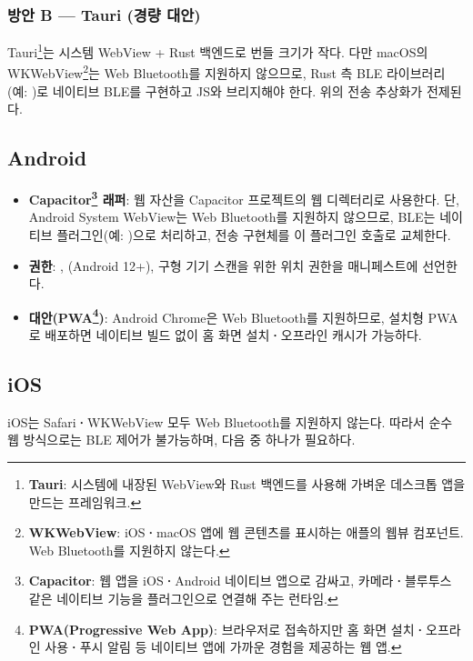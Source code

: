 \subsubsection{방안 B --- Tauri (경량 대안)}

Tauri\footnote{\textbf{Tauri}: 시스템에 내장된 WebView와 Rust 백엔드를 사용해 가벼운 데스크톱
앱을 만드는 프레임워크.}는 시스템 WebView + Rust 백엔드로 번들 크기가 작다. 다만 macOS의
WKWebView\footnote{\textbf{WKWebView}: iOS\textbf{·}macOS 앱에 웹 콘텐츠를 표시하는 애플의 웹뷰
컴포넌트. Web Bluetooth를 지원하지 않는다.}는 Web Bluetooth를 지원하지 않으므로, Rust 측 BLE 라이브러리
(예: )로 네이티브 BLE를 구현하고 JS와 브리지해야 한다.
위의 전송 추상화가 전제된다.

\subsection{Android}

\begin{itemize}
  \item \textbf{Capacitor\footnote{\textbf{Capacitor}: 웹 앱을 iOS\textbf{·}Android 네이티브 앱으로
        감싸고, 카메라\textbf{·}블루투스 같은 네이티브 기능을 플러그인으로 연결해 주는 런타임.} 래퍼}:
         웹 자산을 Capacitor 프로젝트의
        웹 디렉터리로 사용한다. 단, Android System WebView는 Web Bluetooth를
        지원하지 않으므로, BLE는 네이티브 플러그인(예:
        )으로 처리하고, 전송 구현체를
        이 플러그인 호출로 교체한다.
  \item \textbf{권한}: , 
        (Android 12+), 구형 기기 스캔을 위한 위치 권한을 매니페스트에 선언한다.
  \item \textbf{대안(PWA\footnote{\textbf{PWA(Progressive Web App)}: 브라우저로 접속하지만 홈 화면
        설치\textbf{·}오프라인 사용\textbf{·}푸시 알림 등 네이티브 앱에 가까운 경험을 제공하는 웹 앱.})}:
        Android Chrome은 Web Bluetooth를 지원하므로, 설치형
        PWA로 배포하면 네이티브 빌드 없이 홈 화면 설치\textbf{·}오프라인 캐시가
        가능하다.
\end{itemize}

\subsection{iOS}

iOS는 Safari\textbf{·}WKWebView 모두 Web Bluetooth를 지원하지 않는다. 따라서
순수 웹 방식으로는 BLE 제어가 불가능하며, 다음 중 하나가 필요하다.

